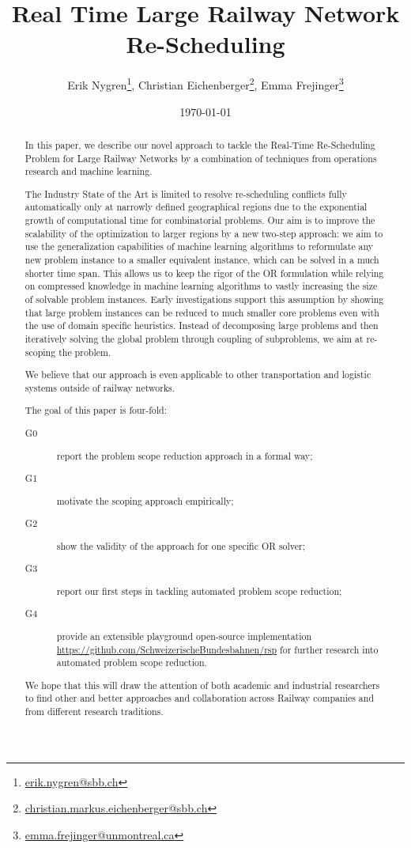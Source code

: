 \documentclass{article}
\title{Real Time Large Railway Network Re-Scheduling}
\author{Erik Nygren\footnote{\url{erik.nygren@sbb.ch}}, Christian Eichenberger\footnote{\url{christian.markus.eichenberger@sbb.ch}}, Emma Frejinger\footnote{\url{emma.frejinger@unmontreal.ca}}}
\date{\today}
\begin{document}
\maketitle

\tableofcontents
\newpage
\begin{abstract}
In this paper, we describe our novel approach to tackle the Real-Time Re-Scheduling Problem for Large Railway Networks by a combination of techniques from operations research and machine learning.

The Industry State of the Art is limited to resolve re-scheduling conflicts fully automatically only at narrowly defined geographical regions due to the exponential growth of computational time for combinatorial problems. Our aim is to improve the scalability of the optimization to larger regions by a new two-step approach: we aim to use the generalization capabilities of machine learning algorithms to reformulate any new problem instance to a smaller equivalent instance, which can be solved in a much shorter time span.
This allows us to keep the rigor of the OR formulation while relying on compressed knowledge in machine learning algorithms to vastly increasing the size of solvable problem instances.
Early investigations support this assumption by showing that large problem instances can be reduced to much smaller core problems even with the use of domain specific heuristics.
Instead of decomposing large problems and then iteratively solving the global problem through coupling of subproblems, we aim at re-scoping the problem.

We believe that our approach is even applicable to other transportation and logistic systems outside of railway networks.

The goal of this paper is four-fold:
\begin{description}
\item[G0] report the problem scope reduction approach in a formal way;
\item[G1] motivate the scoping approach empirically;
\item[G2] show the validity of the approach for one specific OR solver;
\item[G3] report our first steps in tackling automated problem scope reduction;
\item[G4] provide an extensible playground open-source implementation \url{https://github.com/SchweizerischeBundesbahnen/rsp} for further research into automated problem scope reduction.
\end{description}
 We hope that this will draw the attention of both academic and industrial researchers to find other and better approaches and collaboration across Railway companies and from different research traditions.
\end{abstract}
\end{document}
